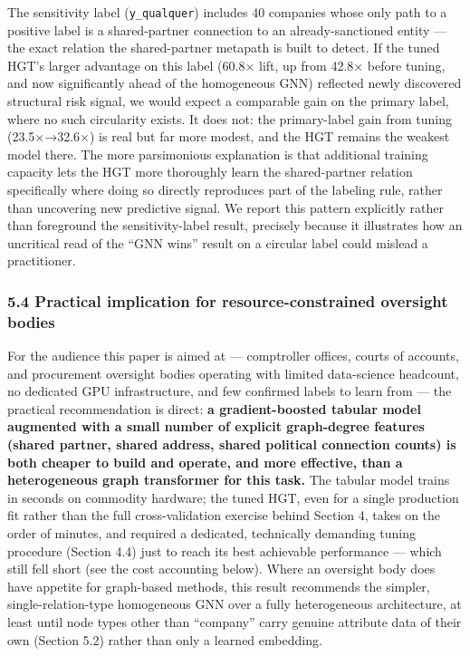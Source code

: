 \documentclass[11pt,]{article}
\begin{document}
The sensitivity label (\texttt{y\_qualquer}) includes 40 companies whose
only path to a positive label is a shared-partner connection to an
already-sanctioned entity --- the exact relation the shared-partner
metapath is built to detect. If the tuned HGT's larger advantage on this
label (60.8× lift, up from 42.8× before tuning, and now significantly
ahead of the homogeneous GNN) reflected newly discovered structural risk
signal, we would expect a comparable gain on the primary label, where no
such circularity exists. It does not: the primary-label gain from tuning
(23.5×→32.6×) is real but far more modest, and the HGT remains the
weakest model there. The more parsimonious explanation is that
additional training capacity lets the HGT more thoroughly learn the
shared-partner relation specifically where doing so directly reproduces
part of the labeling rule, rather than uncovering new predictive signal.
We report this pattern explicitly rather than foreground the
sensitivity-label result, precisely because it illustrates how an
uncritical read of the ``GNN wins'' result on a circular label could
mislead a practitioner.

\hypertarget{practical-implication-for-resource-constrained-oversight-bodies}{%
\subsubsection{5.4 Practical implication for resource-constrained
oversight
bodies}\label{practical-implication-for-resource-constrained-oversight-bodies}}

For the audience this paper is aimed at --- comptroller offices, courts
of accounts, and procurement oversight bodies operating with limited
data-science headcount, no dedicated GPU infrastructure, and few
confirmed labels to learn from --- the practical recommendation is
direct: \textbf{a gradient-boosted tabular model augmented with a small
number of explicit graph-degree features (shared partner, shared
address, shared political connection counts) is both cheaper to build
and operate, and more effective, than a heterogeneous graph transformer
for this task.} The tabular model trains in seconds on commodity
hardware; the tuned HGT, even for a single production fit rather than
the full cross-validation exercise behind Section 4, takes on the order
of minutes, and required a dedicated, technically demanding tuning
procedure (Section 4.4) just to reach its best achievable performance
--- which still fell short (see the cost accounting below). Where an
oversight body does have appetite for graph-based methods, this result
recommends the simpler, single-relation-type homogeneous GNN over a
fully heterogeneous architecture, at least until node types other than
``company'' carry genuine attribute data of their own (Section 5.2)
rather than only a learned embedding.
\end{document}
